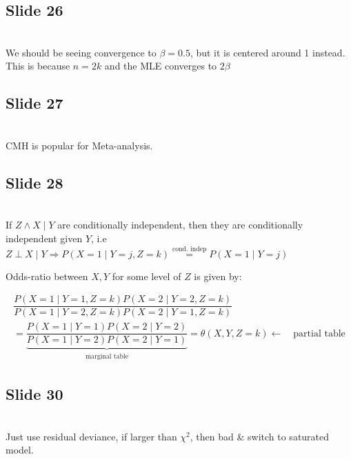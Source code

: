 \subsection{Slide 26}\hfill\\
\noindent We should be seeing convergence to $\beta =0.5$, but it is centered around 1 instead. This is because $n =2k$  and the MLE converges to $2\beta$ 
\par\bigskip
\subsection{Slide 27}\hfill\\
\noindent CMH is popular for Meta-analysis.
\par\bigskip
\subsection{Slide 28}\hfill\\
\noindent If $Z\wedge X\mid Y$ are conditionally independent, then they are conditionally independent given $Y$, i.e $Z\perp X\mid Y\Rightarrow P(X=1\mid Y=j, Z=k)\stackrel{\text{cond. indep}}{=}P(X=1\mid Y=j)$\par
\noindent Odds-ratio between $X,Y$ for some level of $Z$ is given by:
\par\bigskip
\begin{equation*}
  \begin{gathered}
    \dfrac{P(X=1\mid Y=1, Z=k)P(X=2\mid Y=2, Z=k)}{P(X=1\mid Y=2, Z=k)P(X=2\mid Y=1,Z=k)}\\
    = \underbrace{\dfrac{P(X=1\mid Y=1)P(X=2\mid Y=2)}{P(X=1\mid Y=2)P(X=2\mid Y=1)}}_{\substack{\text{marginal table}}} = \theta(X,Y, Z=k) \leftarrow\quad\text{partial table}
  \end{gathered}
\end{equation*}
\par\bigskip
\subsection{Slide 30}\hfill\\
\noindent Just use residual deviance, if larger than $\chi^2$, then bad \& switch to saturated model.
